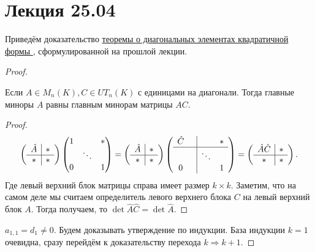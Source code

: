 \section{Лекция 25.04}
Приведём доказательство \hyperref[thm:Формула для диагональных элементов квадратичной формы]{
    теоремы о диагональных элементах квадратичной формы
}, сформулированной на прошлой лекции.
\begin{proof}
    \begin{lemma}
        Если $A\in M_n(K), C\in UT_n(K)$ с единицами на диагонали. Тогда главные миноры
        $A$ равны главным минорам матрицы $AC$.
    \end{lemma}
    \begin{proof}
        \[
        \left(\begin{array}{c|c}
                \hat{A} & * \\
                \hline
                 *& *
        \end{array}\right)
        \begin{pmatrix}
            1 & & *\\
              &\ddots&\\
            0 & & 1
        \end{pmatrix} =
        \left(\begin{array}{c|c}
                \hat{A} & * \\
                \hline
                * & *
        \end{array}\right)
        \left(\begin{array}{cc|cc}
                \hat{C} & & &* \\
                \hline
                &&\ddots&\\
                0&&&1
        \end{array}\right)=
        \left(\begin{array}{c|c}
                \hat{A} \hat{C} & * \\
                \hline
                 * & *
        \end{array}\right)
        .\] 
        Где левый верхний блок матрицы справа имеет размер $k\times k$.
        Заметим, что на самом деле мы считаем определитель левого верхнего блока $C$ на левый верхний блок $A$.
        Тогда получаем, то  $\det \hat{A} \hat{C} = \det \hat{A}$.
    \end{proof}
    $a_{1,1} = d_1 \neq 0$.
    Будем доказывать утверждение по индукции. База индукции $k = 1$ очевидна,
    сразу перейдём к доказательству перехода $k \Rightarrow k + 1$.

\end{proof}
